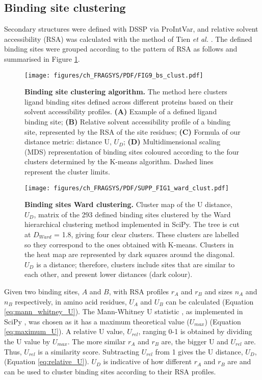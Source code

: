 \subsection{Binding site clustering}

Secondary structures were defined with DSSP \cite{KABSCH_1983_DSSP} via ProIntVar, and relative solvent accessibility (RSA) was calculated with the method of  Tien \textit{et al.} \cite{TIEN_2013_RSA}. The defined binding sites were grouped according to the pattern of RSA as follows and summarised in Figure \ref{fig:fragsys_bs_clust}.

\begin{figure}[H]
    \centering
    \texttt{[image: figures/ch\_FRAGSYS/PDF/FIG9\_bs\_clust.pdf]}
    \caption[Binding site clustering algorithm]{\textbf{Binding site clustering algorithm.} The method here clusters ligand binding sites defined across different proteins based on their solvent accessibility profiles. \textbf{(A)} Example of a defined ligand binding site; \textbf{(B)} Relative solvent accessibility profile of a binding site, represented by the RSA of the site residues; \textbf{(C)} Formula of our distance metric: distance U, $U_{D}$; \textbf{(D)} Multidimensional scaling (MDS) representation of binding sites coloured according to the four clusters determined by the K-means algorithm. Dashed lines represent the cluster limits.}
    \label{fig:fragsys_bs_clust}
\end{figure}

\begin{figure}[H]
    \centering
    \texttt{[image: figures/ch\_FRAGSYS/PDF/SUPP\_FIG1\_ward\_clust.pdf]}
    \caption[Binding sites Ward clustering]{\textbf{Binding sites Ward clustering.} Cluster map of the U distance, $U_{D}$, matrix of the 293 defined binding sites clustered by the Ward hierarchical clustering method implemented in SciPy. The tree is cut at $D_{Ward}$ = 1.8, giving four clear clusters. These clusters are labelled so they correspond to the ones obtained with K-means. Clusters in the heat map are represented by dark squares around the diagonal. $U_{D}$ is a distance; therefore, clusters include sites that are similar to each other, and present lower distances (dark colour).}
    \label{fig:fragsys_bs_clust_ward}
\end{figure}

Given two binding sites, $A$ and $B$, with RSA profiles $r_{A}$ and $r_{B}$ and sizes $n_{A}$ and $n_{B}$ respectively, in amino acid residues, $U_{A}$ and $U_{B}$ can be calculated (Equation \ref{eq:mann_whitney_U}). The Mann-Whitney U statistic \cite{MANN_WHITNEY_1947_TEST}, as implemented in SciPy \cite{VIRTANEN_2020_SCIPY}, was chosen as it has a maximum theoretical value ($U_{max}$) (Equation \ref{eq:maximum_U}). A relative U value, $U_{rel}$, ranging 0-1 is obtained by dividing the U value by $U_{max}$. The more similar $r_{A}$ and $r_{B}$ are, the bigger U and $U_{rel}$ are. Thus, $U_{rel}$ is a similarity score. Subtracting $U_{rel}$ from 1 gives the U distance, $U_{D}$, (Equation \ref{eq:relative_U}). $U_{D}$ is indicative of how different $r_{A}$ and $r_{B}$ are and can be used to cluster binding sites according to their RSA profiles.


